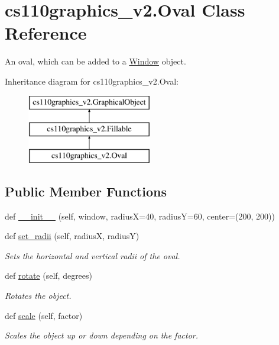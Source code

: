 \hypertarget{classcs110graphics__v2_1_1Oval}{}\section{cs110graphics\+\_\+v2.\+Oval Class Reference}
\label{classcs110graphics__v2_1_1Oval}


An oval, which can be added to a \mbox{\hyperlink{classcs110graphics__v2_1_1Window}{Window}} object.  


Inheritance diagram for cs110graphics\+\_\+v2.\+Oval\+:\begin{figure}[H]
\begin{center}
\leavevmode
\includegraphics[height=3.000000cm]{classcs110graphics__v2_1_1Oval}
\end{center}
\end{figure}
\subsection*{Public Member Functions}
\begin{DoxyCompactItemize}
\item 
def \mbox{\hyperlink{classcs110graphics__v2_1_1Oval_aaf5ae39ca0befa144c78ee0b3c76be7d}{\+\_\+\+\_\+init\+\_\+\+\_\+}} (self, window, radiusX=40, radiusY=60, center=(200, 200))
\item 
def \mbox{\hyperlink{classcs110graphics__v2_1_1Oval_a0b233a4da55c8706bc24f9c513d2c213}{set\+\_\+radii}} (self, radiusX, radiusY)
\begin{DoxyCompactList}\small\item\em Sets the horizontal and vertical radii of the oval. \end{DoxyCompactList}\item 
def \mbox{\hyperlink{classcs110graphics__v2_1_1Oval_af8c159d2ab0f84dd27099639c9b002d3}{rotate}} (self, degrees)
\begin{DoxyCompactList}\small\item\em Rotates the object. \end{DoxyCompactList}\item 
def \mbox{\hyperlink{classcs110graphics__v2_1_1Oval_abb433bbfccb014b097f09c063530a4e0}{scale}} (self, factor)
\begin{DoxyCompactList}\small\item\em Scales the object up or down depending on the factor. \end{DoxyCompactList}\end{DoxyCompactItemize}



